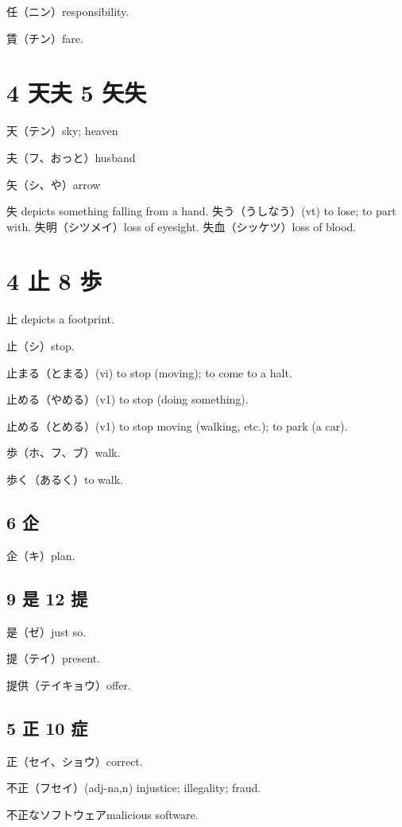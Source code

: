 任（ニン）responsibility.

賃（チン）fare.

\section{4 天夫 5 矢失}

天（テン）sky; heaven

夫（フ、おっと）husband

矢（シ、や）arrow

失 depicts something falling from a hand.
失う（うしなう）(vt) to lose; to part with.
失明（シツメイ）loss of eyesight.
失血（シッケツ）loss of blood.

\section{4 止 8 歩}

止 depicts a footprint.

止（シ）stop.

止まる（とまる）(vi) to stop (moving); to come to a halt.

止める（やめる）(v1) to stop (doing something).

止める（とめる）(v1) to stop moving (walking, etc.); to park (a car).

歩（ホ、フ、ブ）walk.

歩く（あるく）to walk.

\subsection{6 企}

企（キ）plan.

\subsection{9 是 12 提}

是（ゼ）just so.

提（テイ）present.

提供（テイキョウ）offer.

\subsection{5 正 10 症}

正（セイ、ショウ）correct.

不正（フセイ）(adj-na,n) injustice; illegality; fraud.

不正なソフトウェアmalicious software.

